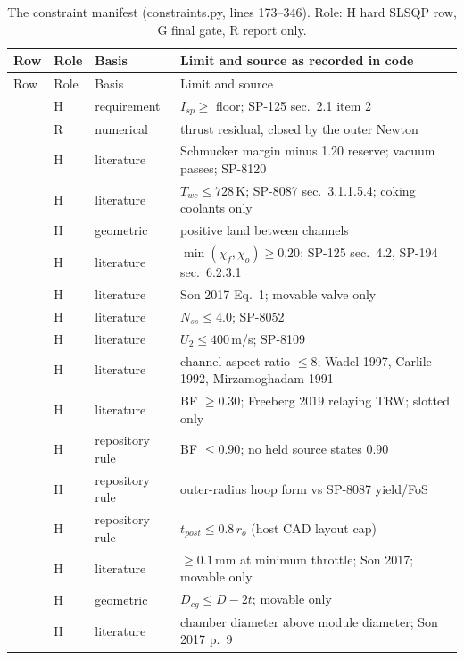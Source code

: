 {\footnotesize
\begin{longtable}{@{}P{3.6cm}P{0.9cm}P{2.3cm}P{9.0cm}@{}}
\caption{The constraint manifest (constraints.py, lines 173--346). Role: H hard SLSQP row, G final gate, R report only.}\label{tab:s13-manifest}\\
\toprule
Row & Role & Basis & Limit and source as recorded in code\\
\midrule\endfirsthead
\toprule Row & Role & Basis & Limit and source\\ \midrule\endhead
{} & H & requirement & $I_{sp}\ge$ floor; SP-125 sec.~2.1 item 2\\
 & R & numerical & thrust residual, closed by the outer Newton\\
 & H & literature & Schmucker margin minus 1.20 reserve; vacuum passes; SP-8120\\
 & H & literature & $T_{wc}\le728$\,K; SP-8087 sec.~3.1.1.5.4; coking coolants only\\
 & H & geometric & positive land between channels\\
 & H & literature & $\min(\chi_f,\chi_o)\ge0.20$; SP-125 sec.~4.2, SP-194 sec.~6.2.3.1\\
 & H & literature & Son 2017 Eq.~1; movable valve only\\
 & H & literature & $N_{ss}\le4.0$; SP-8052\\
 & H & literature & $U_2\le400$\,m/s; SP-8109\\
 & H & literature & channel aspect ratio $\le8$; Wadel 1997, Carlile 1992, Mirzamoghadam 1991\\
 & H & literature & BF $\ge0.30$; Freeberg 2019 relaying TRW; slotted only\\
 & H & repository rule & BF $\le0.90$; no held source states 0.90\\
 & H & repository rule & outer-radius hoop form vs SP-8087 yield/FoS\\
 & H & repository rule & $t_{post}\le0.8\,r_o$ (host CAD layout cap)\\
 & H & literature & $\ge0.1$\,mm at minimum throttle; Son 2017; movable only\\
 & H & geometric & $D_{cg}\le D-2t$; movable only\\
 & H & literature & chamber diameter above module diameter; Son 2017 p.~9\\

\end{longtable}}

